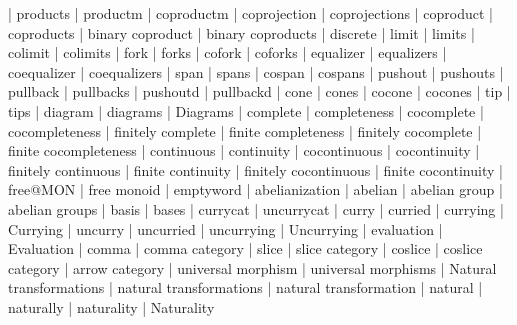     |   products
    |   productm
    |   coproductm
    |   coprojection
    |   coprojections
    |   coproduct
    |   coproducts
    |   binary coproduct
    |   binary coproducts
    |   discrete
    |   limit
    |   limits
    |   colimit
    |   colimits
    |   fork
    |   forks
    |   cofork
    |   coforks
    |   equalizer
    |   equalizers
    |   coequalizer
    |   coequalizers
    |   span
    |   spans
    |   cospan
    |   cospans
    |   pushout
    |   pushouts
    |   pullback
    |   pullbacks
    |   pushoutd
    |   pullbackd
    |   cone
    |   cones
    |   cocone
    |   cocones
    |   tip
    |   tips
    |   diagram
    |   diagrams
    |   Diagrams
    |   complete
    |   completeness
    |   cocomplete
    |   cocompleteness
    |   finitely complete
    |   finite completeness
    |   finitely cocomplete
    |   finite cocompleteness
    |   continuous
    |   continuity
    |   cocontinuous
    |   cocontinuity
    |   finitely continuous
    |   finite continuity
    |   finitely cocontinuous
    |   finite cocontinuity
    |   free@MON
    |   free monoid
    |   emptyword
    |   abelianization
    |   abelian
    |   abelian group
    |   abelian groups
    |   basis
    |   bases
    |   currycat
    |   uncurrycat
    |   curry
    |   curried
    |   currying
    |   Currying
    |   uncurry
    |   uncurried
    |   uncurrying
    |   Uncurrying
    |   evaluation
    |   Evaluation
    |   comma
    |   comma category
    |   slice
    |   slice category
    |   coslice
    |   coslice category
    |   arrow category
    |   universal morphism
    |   universal morphisms
    |   Natural transformations
    |   natural transformations
    |   natural transformation
    |   natural
    |   naturally
    |   naturality
    |   Naturality
